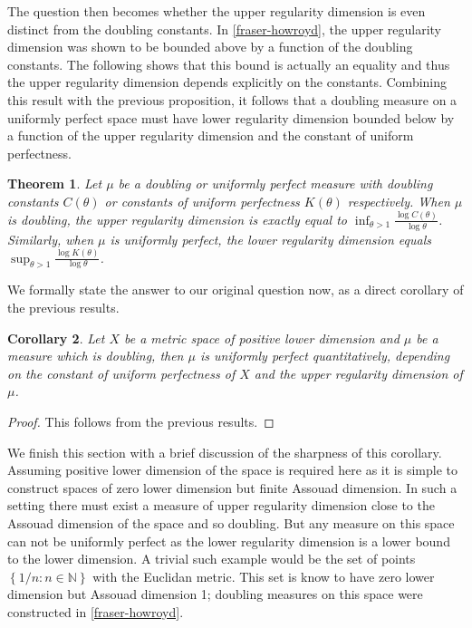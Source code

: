 \documentclass[12pt]{amsart}
\numberwithin{equation}{section}
\newtheorem{thm}{Theorem}[section]
\newtheorem{cor}[thm]{Corollary}
\begin{document}
The question then becomes whether the upper regularity dimension is even distinct from the doubling constants. In \ref{fraser-howroyd}, the upper regularity dimension was shown to be bounded  above by a function of the doubling constants. The following shows that this bound is actually an equality and thus the upper regularity dimension depends explicitly on the constants. Combining this result with the previous proposition, it follows that a doubling measure on a uniformly perfect space must have lower regularity dimension bounded below by a function of the upper regularity dimension and the constant of uniform perfectness.

\begin{thm}
Let $\mu$ be a doubling or uniformly perfect measure with doubling constants $C(\theta)$ or constants of uniform perfectness $K(\theta)$ respectively. When $\mu$ is doubling, the upper regularity dimension is exactly equal to $\inf_{\theta > 1}\frac{\log C(\theta)}{\log \theta}$. Similarly, when $\mu$ is uniformly perfect, the lower regularity dimension equals $\sup_{\theta > 1} \frac{\log K(\theta)}{\log \theta}$.
\end{thm}


We formally state the answer to our original question now, as a direct corollary of the previous results.

\begin{cor}
Let $X$ be a metric space of positive lower dimension and $\mu$ be a measure which is doubling, then $\mu$ is uniformly perfect quantitatively, depending on the constant of uniform perfectness of $X$ and the upper regularity dimension of $\mu$.
\end{cor}

\begin{proof}
This follows from the previous results.
\end{proof}


We finish this section with a brief discussion of the sharpness of this corollary. Assuming positive lower dimension of the space is required here as it is simple to construct spaces of zero lower dimension but finite Assouad dimension. In such a setting there must exist a measure of upper regularity dimension close to the Assouad dimension of the space and so doubling. But any measure on this space can not be uniformly perfect as the lower regularity dimension is a lower bound to the lower dimension. A trivial such example would be the set of points $\left\{ 1/n : n \in \mathbb{N} \right\}$ with the Euclidan metric. This set is know to have zero lower dimension but Assouad dimension 1; doubling measures on this space were constructed in \ref{fraser-howroyd}.
\end{document}

